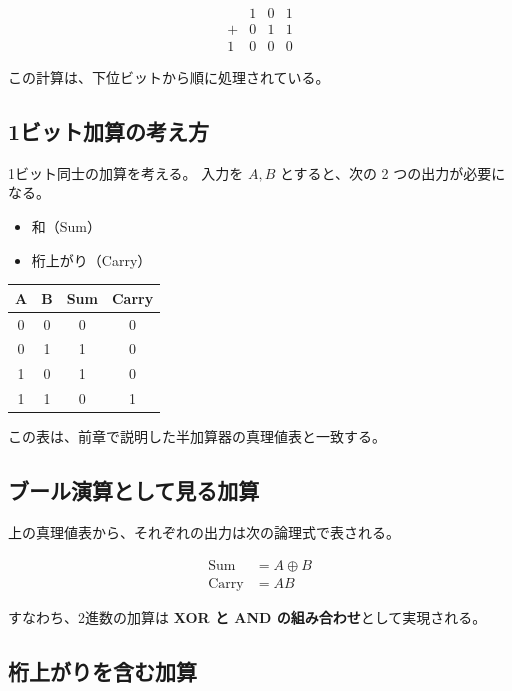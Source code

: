 \[
\begin{array}{cccc}
 & 1 & 0 & 1 \\
+& 0 & 1 & 1 \\
\hline
1 & 0 & 0 & 0
\end{array}
\]

この計算は、下位ビットから順に処理されている。

\subsection{1ビット加算の考え方}

1ビット同士の加算を考える。
入力を $A,B$ とすると、次の 2 つの出力が必要になる。

\begin{itemize}
  \item 和（Sum）
  \item 桁上がり（Carry）
\end{itemize}

\begin{center}
\begin{tabular}{cc|cc}
\toprule
A & B & Sum & Carry \\
\midrule
0 & 0 & 0 & 0 \\
0 & 1 & 1 & 0 \\
1 & 0 & 1 & 0 \\
1 & 1 & 0 & 1 \\
\bottomrule
\end{tabular}
\end{center}

この表は、前章で説明した半加算器の真理値表と一致する。

\subsection{ブール演算として見る加算}

上の真理値表から、それぞれの出力は次の論理式で表される。

\begin{align*}
\text{Sum} &= A \oplus B \\
\text{Carry} &= AB
\end{align*}

すなわち、2進数の加算は
\textbf{XOR と AND の組み合わせ}として実現される。

\subsection{桁上がりを含む加算}


